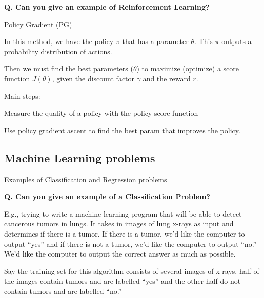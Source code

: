 \begin{frame}[fragile]{\textbf{Q. Can you give an example of Reinforcement Learning?}}
  \begin{wideitemize}
    \item Policy Gradient (PG)
    \begin{wideitemize}
      \item In this method, we have the policy $\pi$ that has a parameter $\theta$. This $\pi$
      outputs a probability distribution of actions.
      \item Then we must find the best parameters ($\theta$) to maximize (optimize) a score
      function $J(\theta)$, given the discount factor $\gamma$ and the reward $r.$
      \item Main steps:\medskip
      \begin{wideitemize}
        \item Measure the quality of a policy with the policy score function
        \item Use policy gradient ascent to find the best param that improves the policy.
      \end{wideitemize}
    \end{wideitemize}
  \end{wideitemize}
\end{frame}

\subsection{Machine Learning problems}
\begin{transitionsubframe}
  \begin{center}
    \Huge Examples of Classification and Regression problems
  \end{center}
\end{transitionsubframe}


\begin{frame}[fragile]{\textbf{Q. Can you give an example of a Classification Problem?}}
  \begin{wideitemize}
    \item E.g., trying to write a machine learning program that will be able to detect cancerous
    tumors in lungs. It takes in images of lung x-rays as input and determines if there is a tumor.
    If there is a tumor, we'd like the computer to output ``yes'' and if there is not a tumor, we'd
    like the computer to output ``no.'' We’d like the computer to output the correct answer as much as possible.
    \item Say the training set for this algorithm consists of several images of x-rays, half of the images
    contain tumors and are labelled ``yes'' and the other half do not contain tumors and are labelled ``no.''
  \end{wideitemize}
\end{frame}

